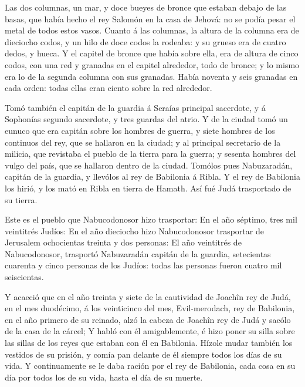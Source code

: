  Las dos columnas, un mar, y doce bueyes de bronce que
estaban debajo de las basas, que había hecho el rey Salomón en la casa
de Jehová: no se podía pesar el metal de todos estos vasos.
 Cuanto á las columnas, la altura de la columna era de
dieciocho codos, y un hilo de doce codos la rodeaba: y su grueso era de
cuatro dedos, y hueca.  Y el capitel de bronce que había
sobre ella, era de altura de cinco codos, con una red y granadas en el
capitel alrededor, todo de bronce; y lo mismo era lo de la segunda
columna con sus granadas.  Había noventa y seis granadas en
cada orden: todas ellas eran ciento sobre la red alrededor.

 Tomó también el capitán de la guardia á Seraías principal
sacerdote, y á Sophonías segundo sacerdote, y tres guardas del atrio.
 Y de la ciudad tomó un eunuco que era capitán sobre los
hombres de guerra, y siete hombres de los continuos del rey, que se
hallaron en la ciudad; y al principal secretario de la milicia, que
revistaba el pueblo de la tierra para la guerra; y sesenta hombres del
vulgo del país, que se hallaron dentro de la ciudad. 
Tomólos pues Nabuzaradán, capitán de la guardia, y llevólos al rey de
Babilonia á Ribla.  Y el rey de Babilonia los hirió, y los
mató en Ribla en tierra de Hamath. Así fué Judá trasportado de su
tierra.

 Este es el pueblo que Nabucodonosor hizo trasportar: En el
año séptimo, tres mil veintitrés Judíos:  En el año
dieciocho hizo Nabucodonosor trasportar de Jerusalem ochocientas treinta
y dos personas:  El año veintitrés de Nabucodonosor,
trasportó Nabuzaradán capitán de la guardia, setecientas cuarenta y
cinco personas de los Judíos: todas las personas fueron cuatro mil
seiscientas.

 Y acaeció que en el año treinta y siete de la cautividad
de Joachîn rey de Judá, en el mes duodécimo, á los veinticinco del mes,
Evil-merodach, rey de Babilonia, en el año primero de su reinado, alzó
la cabeza de Joachîn rey de Judá y sacólo de la casa de la cárcel;
 Y habló con él amigablemente, é hizo poner su silla sobre
las sillas de los reyes que estaban con él en Babilonia. 
Hízole mudar también los vestidos de su prisión, y comía pan delante de
él siempre todos los días de su vida.  Y continuamente se
le daba ración por el rey de Babilonia, cada cosa en su día por todos
los de su vida, hasta el día de su muerte.
